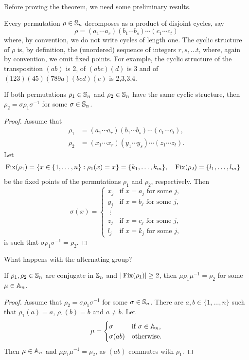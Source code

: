 Before proving the theorem, we need some preliminary results.

Every permutation $\rho\in\mathbb{S}_n$ decomposes as a product of disjoint cycles, say
\[
\rho=(a_1\cdots a_r)(b_1\cdots b_s)\cdots (c_1\cdots c_t)
\]
where, by convention, we do not write cycles of length one. 
The cyclic structure of $\rho$ is, by definition, the (unordered) 
sequence of integers $r,s,\dots t$, where, again by convention,  
we omit fixed points. For example, the cyclic structure of 
the transposition $(ab)$ is 2, 
of $(abc)(d)$ is 3 and of $(123)(45)(789a)(bcd)(e)$ is 2,3,3,4. 

\begin{lemma}
If both permutations $\rho_1\in\mathbb{S}_n$ and $\rho_2\in\mathbb{S}_n$ have the same
cyclic structure, then 
$\rho_2=\sigma\rho_1\sigma^{-1}$ for some
$\sigma\in\mathbb{S}_n$. 
\end{lemma}

\begin{proof}
Assume that 
\begin{align*}
\rho_1&=(a_1\cdots a_r)(b_1\cdots b_s)\cdots (c_1\cdots c_t),\\
\rho_2&=(x_1\cdots x_r)(y_1\cdots y_s)\cdots (z_1\cdots z_t).
\end{align*}
Let  
\begin{align*}
\operatorname{Fix}(\rho_1) &= \{x\in\{1,\dots,n\}:\rho_1(x)=x\}=\{k_1,\dots,k_m\},&&
\operatorname{Fix}(\rho_2)=\{l_1,\dots,l_m\}	
\end{align*}
be the fixed points of the permutations $\rho_1$ and $\rho_2$,
respectively. Then 
\[
\sigma(x)=\begin{cases}
x_j & \text{if $x=a_j$ for some $j$},\\
y_j & \text{if $x=b_j$ for some $j$},\\
\;\vdots\\
z_j & \text{if $x=c_j$ for some $j$},\\
l_j & \text{if $x=k_j$ for some $j$},	
\end{cases}
\]
is such that $\sigma\rho_1\sigma^{-1}=\rho_2$. 
\end{proof}

What happens with the alternating group? 

\begin{lemma}
If $\rho_1,\rho_2\in\mathbb{S}_n$ are conjugate in $\mathbb{S}_n$ and  $|\operatorname{Fix}(\rho_1)|\geq2$, then 
$\mu\rho_1\mu^{-1}=\rho_2$ for some $\mu\in\mathbb{A}_n$.  
\end{lemma}

\begin{proof}
Assume that $\rho_2=\sigma\rho_1\sigma^{-1}$ for some $\sigma\in\mathbb{S}_n$. 
There are $a,b\in\{1,\dots,n\}$ such that
$\rho_1(a)=a$, $\rho_1(b)=b$ and $a\ne b$. Let 
\[
\mu=\begin{cases}
\sigma & \text{if $\sigma\in\mathbb{A}_n$,}\\
\sigma(ab) & \text{otherwise.}
\end{cases}
\]
Then $\mu\in\mathbb{A}_n$ and $\mu\rho_1\mu^{-1}=\rho_2$, as 
$(ab)$ commutes with $\rho_1$. 
\end{proof}

